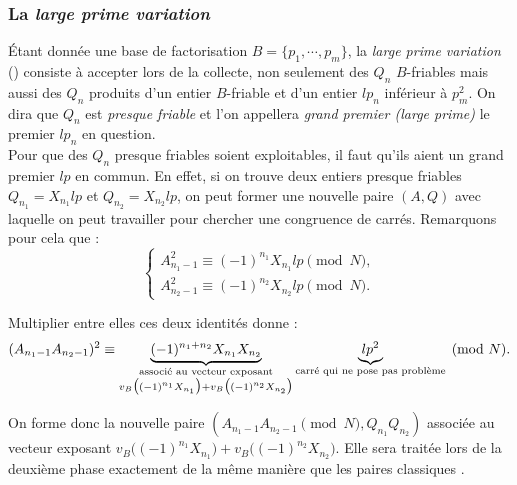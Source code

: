 \subsubsection{La \textit{large prime variation }}

Étant donnée une base de factorisation $B = \{ p_1, \cdots, p_m\}$, la
\textit{large prime variation } (\cite{PW}) consiste à accepter lors de la collecte, non
seulement des $Q_n$ $B$-friables mais aussi des $Q_n$ produits d'un entier
$B$-friable et d'un entier $lp_n$ inférieur à $p_m^2$. On dira que $Q_n$ est
\emph{presque friable} et l'on appellera \emph{grand premier (large prime)} le
premier $lp_n$ en question. \\

Pour que des $Q_n$ presque friables soient exploitables, il faut qu'ils aient
un grand premier $lp$ en commun. En effet, si on trouve deux entiers presque
friables $Q_{n_1} = X_{n_1}lp $ et $Q_{n_2} =  X_{n_2}lp $, on peut former une
nouvelle paire $(A,Q)$ avec laquelle on peut travailler pour chercher une 
congruence de carrés. Remarquons pour cela que :
\[\begin{cases}
	A_{n_1 -1}^2 \equiv (-1)^{n_1} X_{n_1}lp\pmod{N}, \\
	A_{n_2 -1}^2 \equiv (-1)^{n_2} X_{n_2}lp\pmod{N}.
\end{cases}\]

Multiplier entre elles ces deux identités donne :
\[(A_{n_1 -1} A_{n_2 -1})^2 \equiv 
     \underbrace{(-1)^{n_1 + n_2} X_{n_1} X_{n_2}}_
            {\begin{subarray}{c}\text{associé au vecteur exposant}\\
             v_{B} \big( (-1 )^{n_1} X_{n_1} \big)
             + v_{B} \big( (-1 )^{n_2} X_{n_2} \big) \end{subarray}
             }
    \underbrace{lp^2}_{\text{carré qui ne pose pas problème}}
    \pmod{N}.
 \]
  
On forme donc la nouvelle paire $ (A_{n_1-1}A_{n_2 -1} \pmod{N},
Q_{n_1}Q_{n_2}) $ associée au vecteur exposant $v_{B} \big( (-1 )^{n_1} X_{n_1}
\big)+ v_{B} \big( (-1 )^{n_2} X_{n_2} \big) $.  Elle sera traitée lors de la
deuxième phase exactement de la même manière que les paires \og classiques
\fg{}.\\

